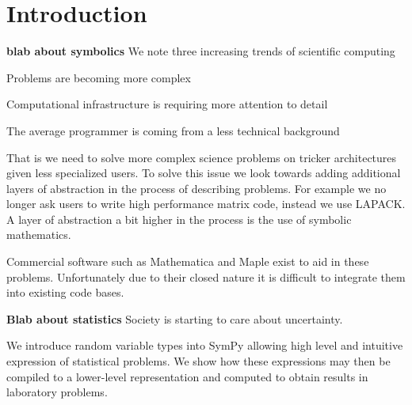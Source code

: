 \section{Introduction}

{\bf blab about symbolics}
We note three increasing trends of scientific computing
\begin{enumerate*}
\item Problems are becoming more complex
\item Computational infrastructure is requiring more attention to detail
\item The average programmer is coming from a less technical background
\end{enumerate*}

That is we need to solve more complex science problems on tricker architectures given less specialized users. To solve this issue we look towards adding additional layers of abstraction in the process of describing problems. For example we no longer ask users to write high performance matrix code, instead we use LAPACK. A layer of abstraction a bit higher in the process is the use of symbolic mathematics.

Commercial software such as Mathematica and Maple exist to aid in these problems. Unfortunately due to their closed nature it is difficult to integrate them into existing code bases.

{\bf Blab about statistics}
Society is starting to care about uncertainty.

We introduce random variable types into SymPy allowing high level and intuitive expression of statistical problems. We show how these expressions may then be compiled to a lower-level representation and computed to obtain results in laboratory problems.


